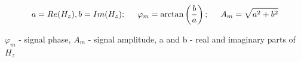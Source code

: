 \documentclass[aspectratio=169]{beamer}
\begin{document}
\begin{frame}
\begin{footnotesize}
\begin{equation}
a = Re(H_{z}), b = Im(H_{z}); \hspace{0.5cm} \varphi_m = \arctan \left( \frac{b}{a} \right); \hspace{0.5cm}  A_m =  {\sqrt{a^2+b^2}}
\end{equation}
\end{footnotesize}

$\varphi_m$ - signal phase, $A_m$ - signal amplitude, a and b - real and imaginary parts of $H_z$

%
%
%
%
%
%


\end{frame}
\end{document}
